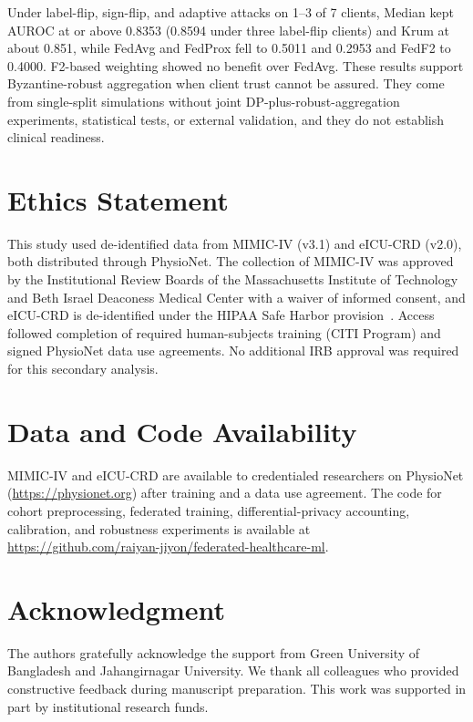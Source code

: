 \documentclass[journal]{IEEEtran}
\begin{document}
Under label-flip, sign-flip, and adaptive attacks on 1--3 of 7 clients, Median kept AUROC at or above 0.8353 (0.8594 under three label-flip clients) and Krum at about 0.851, while FedAvg and FedProx fell to 0.5011 and 0.2953 and FedF2 to 0.4000. F2-based weighting showed no benefit over FedAvg. These results support Byzantine-robust aggregation when client trust cannot be assured. They come from single-split simulations without joint DP-plus-robust-aggregation experiments, statistical tests, or external validation, and they do not establish clinical readiness.

\section*{Ethics Statement}
This study used de-identified data from MIMIC-IV (v3.1) and eICU-CRD (v2.0), both distributed through PhysioNet. The collection of MIMIC-IV was approved by the Institutional Review Boards of the Massachusetts Institute of Technology and Beth Israel Deaconess Medical Center with a waiver of informed consent, and eICU-CRD is de-identified under the HIPAA Safe Harbor provision~\cite{eicu2018}. Access followed completion of required human-subjects training (CITI Program) and signed PhysioNet data use agreements. No additional IRB approval was required for this secondary analysis.

\section*{Data and Code Availability}
MIMIC-IV and eICU-CRD are available to credentialed researchers on PhysioNet (\url{https://physionet.org}) after training and a data use agreement. The code for cohort preprocessing, federated training, differential-privacy accounting, calibration, and robustness experiments is available at \url{https://github.com/raiyan-jiyon/federated-healthcare-ml}.

\section*{Acknowledgment}
The authors gratefully acknowledge the support from Green University of Bangladesh and Jahangirnagar University. We thank all colleagues who provided constructive feedback during manuscript preparation. This work was supported in part by institutional research funds.

\ifCLASSOPTIONcaptionsoff
  \newpage
\fi




\end{document}
